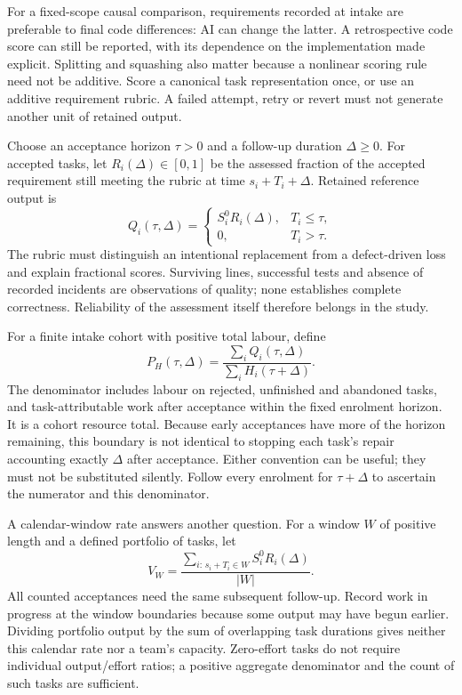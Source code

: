 \documentclass[11pt,a4paper]{amsart}
\theoremstyle{definition}
\theoremstyle{remark}
\begin{document}
For a fixed-scope causal comparison, requirements recorded at intake are preferable to final code differences: AI can change the latter. A retrospective code score can still be reported, with its dependence on the implementation made explicit. Splitting and squashing also matter because a nonlinear scoring rule need not be additive. Score a canonical task representation once, or use an additive requirement rubric. A failed attempt, retry or revert must not generate another unit of retained output.

Choose an acceptance horizon $\tau>0$ and a follow-up duration $\Delta\geq0$. For accepted tasks, let $R_i(\Delta)\in[0,1]$ be the assessed fraction of the accepted requirement still meeting the rubric at time $s_i+T_i+\Delta$. Retained reference output is
\begin{equation}
\label{eq:retention}
 Q_i(\tau,\Delta)=\begin{cases} S_i^0 R_i(\Delta),&T_i\leq\tau,\\ 0,&T_i>\tau.\end{cases}
\end{equation}
The rubric must distinguish an intentional replacement from a defect-driven loss and explain fractional scores. Surviving lines, successful tests and absence of recorded incidents are observations of quality; none establishes complete correctness. Reliability of the assessment itself therefore belongs in the study.

For a finite intake cohort with positive total labour, define
\begin{equation}
\label{eq:cohort-productivity}
 P_H(\tau,\Delta)
 =\frac{\sum_i Q_i(\tau,\Delta)}{\sum_i H_i(\tau+\Delta)}.
\end{equation}
The denominator includes labour on rejected, unfinished and abandoned tasks, and task-attributable work after acceptance within the fixed enrolment horizon. It is a cohort resource total. Because early acceptances have more of the horizon remaining, this boundary is not identical to stopping each task's repair accounting exactly $\Delta$ after acceptance. Either convention can be useful; they must not be substituted silently. Follow every enrolment for $\tau+\Delta$ to ascertain the numerator and this denominator.

A calendar-window rate answers another question. For a window $W$ of positive length and a defined portfolio of tasks, let
\begin{equation}
\label{eq:calendar-throughput}
 V_W=\frac{\sum_{i:\,s_i+T_i\in W}S_i^0R_i(\Delta)}{|W|}.
\end{equation}
All counted acceptances need the same subsequent follow-up. Record work in progress at the window boundaries because some output may have begun earlier. Dividing portfolio output by the sum of overlapping task durations gives neither this calendar rate nor a team's capacity. Zero-effort tasks do not require individual output/effort ratios; a positive aggregate denominator and the count of such tasks are sufficient.
\end{document}

